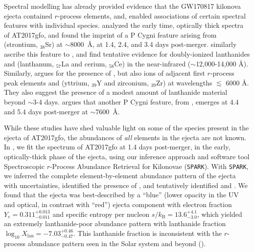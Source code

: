 \documentclass[twocolumn,twocolappendix]{aastex63}
\def\SPARK{\texttt{SPARK}}
\begin{document}
Spectral modelling has already provided evidence that the GW170817 kilonova ejecta contained $r$-process elements, and, enabled associations of certain spectral features with individual species. \cite{watson19} analyzed the early time, optically thick spectra of AT2017gfo, and found the imprint of a P Cygni feature arising from  (strontium, ${}_{38}$Sr) at $\sim$8000~\AA, at 1.4, 2.4, and 3.4 days post-merger. \cite{domoto21, domoto22} similarly ascribe this feature to , and find tentative evidence for doubly-ionized lanthanides  and  (lanthanum, ${}_{57}$La and cerium, ${}_{58}$Ce) in the near-infrared ($\sim$12,000-14,000 \AA). Similarly, \cite{gillanders22} argues for the presence of , but also ions of adjacent first $r$-process peak elements  and  (yttrium, ${}_{39}$Y and zirconium, ${}_{39}$Zr) at wavelengths $\lesssim$ 6000 \AA. They also suggest the presence of a modest amount of lanthanide material beyond $\sim$3-4 days. \cite{sneppenwatson23} argues that another P Cygni feature, from , emerges at 4.4 and 5.4 days post-merger at $\sim$7600~\AA. 

While these studies have shed valuable light on some of the species present in the ejecta of AT2017gfo, the abundances of \textit{all} elements in the ejecta are not known. In \cite{vieira23}, we fit the spectrum of AT2017gfo at 1.4 days post-merger, in the early, optically-thick phase of the ejecta, using our inference approach and software tool Spectroscopic $r$-Process Abundance Retrieval for Kilonovae (\SPARK). With \SPARK, we inferred the complete element-by-element abundance pattern of the ejecta with uncertainties, identified the presence of , and tentatively identified  and . We found that the ejecta was best-described by a ``blue'' (lower opacity in the UV and optical, in contrast with ``red'') ejecta component with electron fraction $Y_e = 0.311^{+0.013}_{-0.011}$ and specific entropy per nucleon $s / k_{\mathrm{B}} = 13.6^{+4.1}_{-3.0}$, which yielded an extremely lanthanide-poor abundance pattern with lanthanide fraction $\log_{10} X_{\mathrm{lan}} = {-7.03}^{+0.46}_{-0.47}$. This lanthanide fraction is inconsistent with the $r$-process abundance pattern seen in the Solar system and beyond (\citealt{ji19}). 
\end{document}

